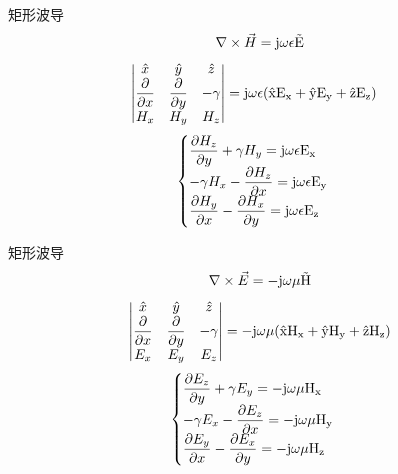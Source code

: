 \begin{frame}{矩形波导}
    \begin{align*}
        \nabla\times\vec{H}=\rm{j}\omega\epsilon \vec{E} 
    \end{align*}
    \begin{align*}
        &\begin{vmatrix}
            \hat{x}                     & \hat{y}                     & \hat{z} \\
            \dfrac{\partial}{\partial x} & \dfrac{\partial}{\partial y} & -\gamma \\
            H_x                         & H_y                         & H_z     \\
        \end{vmatrix}
        =\rm{j}\omega\epsilon(\hat{x}E_x+\hat{y}E_y+\hat{z}E_z)
    \end{align*}
    \begin{align}
        \begin{cases}
            \dfrac{\partial H_z}{\partial y}+\gamma H_y=\rm{j}\omega\epsilon E_x\\
            -\gamma H_x-\dfrac{\partial H_z}{\partial x}=\rm{j}\omega\epsilon E_y\\
            \dfrac{\partial H_y}{\partial x}-\dfrac{\partial H_x}{\partial y}=\rm{j}\omega\epsilon E_z
        \end{cases}
    \end{align}
\end{frame}

\begin{frame}{矩形波导}
    \begin{align*}
        \nabla\times\vec{E}=-\rm{j}\omega\mu \vec{H} 
    \end{align*}
    \begin{align*}
        \begin{vmatrix}
            \hat{x}                     & \hat{y}                     & \hat{z} \\
            \dfrac{\partial}{\partial x} & \dfrac{\partial}{\partial y} & -\gamma \\
            E_x                         & E_y                         & E_z     \\
        \end{vmatrix}
        =-\rm{j}\omega\mu(\hat{x}H_x+\hat{y}H_y+\hat{z}H_z)
    \end{align*}
    \begin{align}
        \begin{cases}
            \dfrac{\partial E_z}{\partial y}+\gamma E_y=-\rm{j}\omega\mu H_x\\
            -\gamma E_x-\dfrac{\partial E_z}{\partial x}=-\rm{j}\omega\mu H_y\\
            \dfrac{\partial E_y}{\partial x}-\dfrac{\partial E_x}{\partial y}=-\rm{j}\omega\mu H_z
        \end{cases}
    \end{align}
\end{frame}

